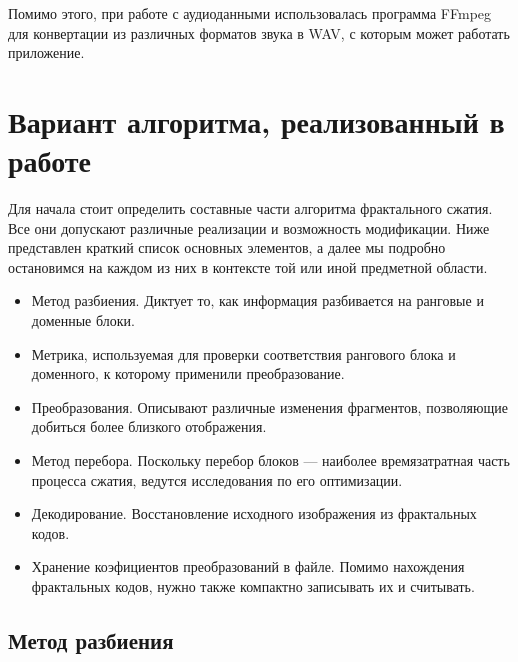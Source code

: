 \documentclass[bachelor,paper]{pmk-graduate}
\theoremstyle{definition}
\begin{document}
Помимо этого, при работе с аудиоданными использовалась программа FFmpeg для конвертации из различных форматов звука в WAV, с которым может работать приложение.

\section{Вариант алгоритма, реализованный в работе}

Для начала стоит определить составные части алгоритма фрактального сжатия. Все они допускают различные реализации и возможность модификации. Ниже представлен краткий список основных элементов, а далее мы подробно остановимся на каждом из них в контексте той или иной предметной области.
\begin{itemize}
  \item Метод разбиения. Диктует то, как информация разбивается на ранговые и доменные блоки.
  \item Метрика, используемая для проверки соответствия рангового блока и доменного, к которому применили преобразование.
  \item Преобразования. Описывают различные изменения фрагментов, позволяющие добиться более близкого отображения.
  \item Метод перебора. Поскольку перебор блоков --- наиболее времязатратная часть процесса сжатия, ведутся исследования по его оптимизации.
  \item Декодирование. Восстановление исходного изображения из фрактальных кодов.
  \item Хранение коэфициентов преобразований в файле. Помимо нахождения фрактальных кодов, нужно также компактно записывать их и считывать.
\end{itemize}



\subsection{Метод разбиения}
\end{document}
